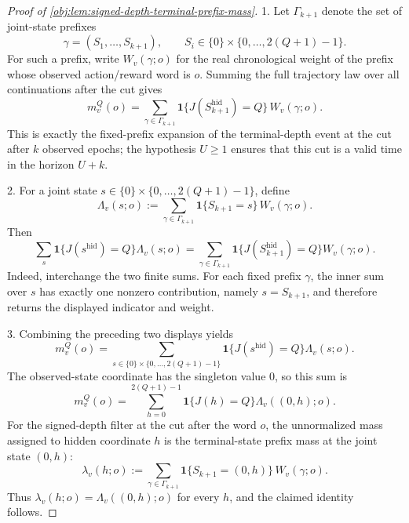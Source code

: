 \begin{proof}[Proof of \cref{obj:lem:signed-depth-terminal-prefix-mass}]
1.  Let \(\Gamma_{k+1}\) denote the set of joint-state prefixes
\[
\gamma=(S_1,\ldots,S_{k+1}),
\qquad
S_i\in \{0\}\times\{0,\ldots,2(Q+1)-1\}.
\]
For such a prefix, write \(W_v(\gamma;o)\) for the real chronological weight of the prefix whose observed action/reward word is \(o\). Summing the full trajectory law over all continuations after the cut gives
\[
m_v^Q(o)
=
\sum_{\gamma\in\Gamma_{k+1}}
\mathbf 1\{J(S_{k+1}^{\mathrm{hid}})=Q\}\,
W_v(\gamma;o).
\]
This is exactly the fixed-prefix expansion of the terminal-depth event at the cut after \(k\) observed epochs; the hypothesis \(U\ge 1\) ensures that this cut is a valid time in the horizon \(U+k\). %

2.  For a joint state \(s\in \{0\}\times\{0,\ldots,2(Q+1)-1\}\), define
\[
\Lambda_v(s;o)
:=
\sum_{\gamma\in\Gamma_{k+1}}
\mathbf 1\{S_{k+1}=s\}\,W_v(\gamma;o).
\]
Then
\[
\sum_{s}
\mathbf 1\{J(s^{\mathrm{hid}})=Q\}\Lambda_v(s;o)
=
\sum_{\gamma\in\Gamma_{k+1}}
\mathbf 1\{J(S_{k+1}^{\mathrm{hid}})=Q\}W_v(\gamma;o).
\]
Indeed, interchange the two finite sums. For each fixed prefix \(\gamma\), the inner sum over \(s\) has exactly one nonzero contribution, namely \(s=S_{k+1}\), and therefore returns the displayed indicator and weight. %

3.  Combining the preceding two displays yields
\[
m_v^Q(o)
=
\sum_{s\in \{0\}\times\{0,\ldots,2(Q+1)-1\}}
\mathbf 1\{J(s^{\mathrm{hid}})=Q\}\Lambda_v(s;o).
\]
The observed-state coordinate has the singleton value \(0\), so this sum is
\[
m_v^Q(o)
=
\sum_{h=0}^{2(Q+1)-1}
\mathbf 1\{J(h)=Q\}\Lambda_v((0,h);o).
\]
For the signed-depth filter at the cut after the word \(o\), the unnormalized mass assigned to hidden coordinate \(h\) is the terminal-state prefix mass at the joint state \((0,h)\):
\[
\lambda_v(h;o)
:=
\sum_{\gamma\in\Gamma_{k+1}}
\mathbf 1\{S_{k+1}=(0,h)\}\,W_v(\gamma;o).
\]
Thus \(\lambda_v(h;o)=\Lambda_v((0,h);o)\) for every \(h\), and the claimed identity follows. %
\end{proof}
